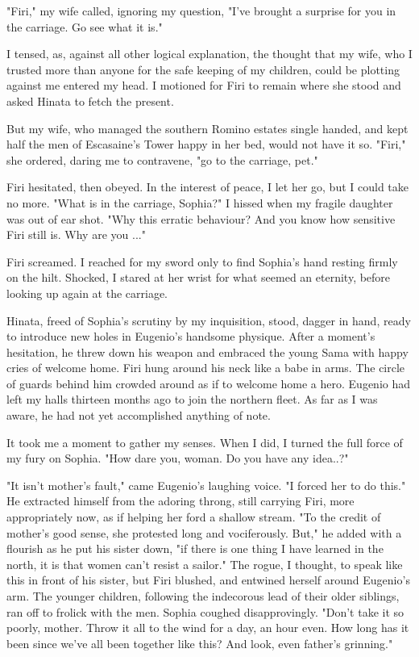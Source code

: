 \documentclass{article}
\begin{document}
"Firi," my wife called, ignoring my question, "I've brought a surprise for you in the carriage. Go see what it is."

I tensed, as, against all other logical explanation, the thought that my wife, who I trusted more than anyone for the safe keeping of my children, could be plotting against me entered my head. I motioned for Firi to remain where she stood and asked Hinata to fetch the present.

But my wife, who managed the southern Romino estates single handed, and kept half the men of Escasaine's Tower happy in her bed, would not have it so. "Firi," she ordered, daring me to contravene, "go to the carriage, pet."

Firi hesitated, then obeyed. In the interest of peace, I let her go, but I could take no more. "What is in the carriage, Sophia?" I hissed when my fragile daughter was out of ear shot. "Why this erratic behaviour? And you know how sensitive Firi still is. Why are you ..."

Firi screamed. I reached for my sword only to find Sophia's hand resting firmly on the hilt. Shocked, I stared at her wrist for what seemed an eternity, before looking up again at the carriage.

Hinata, freed of Sophia's scrutiny by my inquisition, stood, dagger in hand, ready to introduce new holes in Eugenio's handsome physique. After a moment's hesitation, he threw down his weapon and embraced the young Sama with happy cries of welcome home. Firi hung around his neck like a babe in arms. The circle of guards behind him crowded around as if to welcome home a hero. Eugenio had left my halls thirteen months ago to join the northern fleet. As far as I was aware, he had not yet accomplished anything of note.

It took me a moment to gather my senses. When I did, I turned the full force of my fury on Sophia. "How dare you, woman. Do you have any idea..?"

"It isn't mother's fault," came Eugenio's laughing voice. "I forced her to do this." He extracted himself from the adoring throng, still carrying Firi, more appropriately now, as if helping her ford a shallow stream. "To the credit of mother's good sense, she protested long and vociferously. But," he added with a flourish as he put his sister down, "if there is one thing I have learned in the north, it is that women can't resist a sailor." The rogue, I thought, to speak like this in front of his sister, but Firi blushed, and entwined herself around Eugenio's arm. The younger children, following the indecorous lead of their older siblings, ran off to frolick with the men. Sophia coughed disapprovingly. "Don't take it so poorly, mother. Throw it all to the wind for a day, an hour even. How long has it been since we've all been together like this? And look, even father's grinning."
\end{document}
